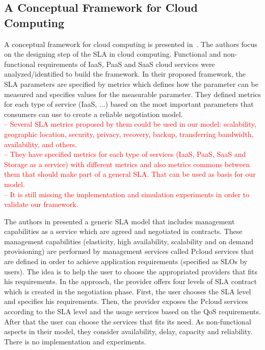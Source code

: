 \documentclass[12pt,a4paper,oneside]{article}
\begin{document}
\subsection{A Conceptual Framework for Cloud Computing}

A conceptual framework for cloud computing is presented in~\cite{005}. The authors focus on the designing step of the SLA in cloud computing. Functional and non-functional requirements of IaaS, PaaS and SaaS cloud services were analyzed/identified to build the framework. In their proposed framework, the SLA parameters are specified by metrics which defines how the parameter can be measured and specifies values for the measurable parameter. They defined metrics for each type of service (IaaS, ...) based on the most important parameters that consumers can use to create a reliable negotiation model. \\ 
\textcolor{red}{-- Several SLA metrics proposed by them could be used in our model: scalability, geographic location, security, privacy, recovery, backup, transferring bandwidth, availability, and others. \\
-- They have specified metrics for each type of services (IaaS, PaaS, SaaS and Storage as a service) with different metrics and also metrics commons between them that should make part of a general SLA. That can be used as basis for our model.\\
-- It is still missing the implementation and simulation experiments in order to validate our framework.}


\bigskip
The authors in \cite{009} presented a generic SLA model that includes management capabilities as a service which are agreed and negotiated in contracts. These management capabilities (elasticity, high availability, scalability and on demand provisioning) are performed by management services called Pcloud services that are defined in order to achieve application requirements (specified as SLOs by users). The idea is to help the user to choose the appropriated providers that fits his requirements. In the approach, the provider offers four levels of SLA contract which is created in the negotiation phase. First, the user chooses the SLA level and specifies his requirements. Then, the provider exposes the Pcloud services according to the SLA level and the usage services based on the QoS requirements. After that the user can choose the services that fits its need. As non-functional aspects in their model, they consider availability, delay, capacity and reliability. There is no implementation and experiments.
\end{document}
